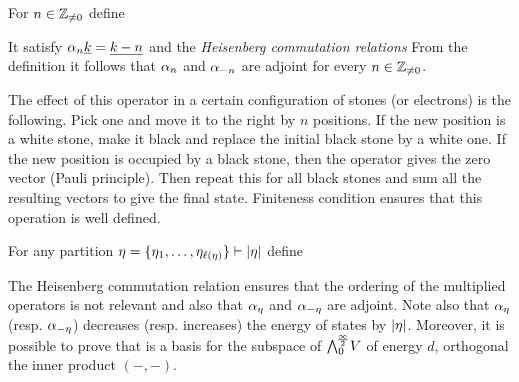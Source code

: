 \documentclass[10pt]{beamer}
\begin{document}
\begin{frame}

\begin{definition}
For $n\in\mathbb Z_{\neq0}$ define\\[-18pt]
\end{definition}

It satisfy $\alpha_n\underline{k}=\underline{k-n}$ and the \emph{Heisenberg commutation relations}
From the definition it follows that $\alpha_n$ and $\alpha_{-n}$ are adjoint for every $n\in\mathbb Z_{\neq0}$.

The effect of this operator in a certain configuration of stones (or electrons) is the following. Pick one and move it to the right by $n$ positions. If the new position is a white stone, make it black and replace the initial black stone by a white one. If the new position is occupied by a black stone, then the operator gives the zero vector (Pauli principle). Then repeat this for all black stones and sum all the resulting vectors to give the final state. Finiteness condition ensures that this operation is well defined. 

\end{frame}

\begin{frame}

\begin{definition}
For any partition $\eta=\{\eta_1,\ldots,\eta_{\ell(\eta)}\}\vdash|\eta|$ define
\end{definition}

The Heisenberg commutation relation ensures that the ordering of the multiplied operators is not relevant and also that $\alpha_\eta$ and $\alpha_{-\eta}$ are adjoint. Note also that $\alpha_{\eta}$ (resp. $\alpha_{-\eta}$) decreases (resp. increases) the energy of states by $|\eta|$. Moreover, it is possible to prove that 
is a basis for the subspace of $\bigwedge^{\!\frac\infty2}_0\!V$ of energy $d$, orthogonal \wrt the inner product $(-,-)$.

\end{frame}
\end{document}
